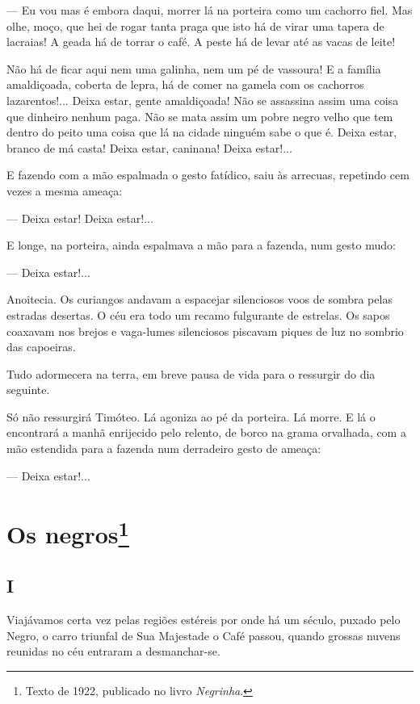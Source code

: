 --- Eu vou mas é embora daqui, morrer lá na porteira como um cachorro
fiel. Mas olhe, moço, que hei de rogar tanta praga que isto há de virar
uma tapera de lacraias! A geada há de torrar o café. A peste há de levar
até as vacas de leite!

Não há de ficar aqui nem uma galinha, nem um pé de vassoura! E a família
amaldiçoada, coberta de lepra, há de comer na gamela com os cachorros
lazarentos!... Deixa estar, gente amaldiçoada! Não se assassina assim
uma coisa que dinheiro nenhum paga. Não se mata assim um pobre negro
velho que tem dentro do peito uma coisa que lá na cidade ninguém sabe o
que é. Deixa estar, branco de má casta! Deixa estar, caninana! Deixa
estar!...

E fazendo com a mão espalmada o gesto fatídico, saiu às arrecuas,
repetindo cem vezes a mesma ameaça:

--- Deixa estar! Deixa estar!...

E longe, na porteira, ainda espalmava a mão para a fazenda, num gesto
mudo:

--- Deixa estar!...

Anoitecia. Os curiangos andavam a espacejar silenciosos voos de sombra
pelas estradas desertas. O céu era todo um recamo fulgurante de
estrelas. Os sapos coaxavam nos brejos e vaga-lumes silenciosos piscavam
piques de luz no sombrio das capoeiras.

Tudo adormecera na terra, em breve pausa de vida para o ressurgir do dia
seguinte.

Só não ressurgirá Timóteo. Lá agoniza ao pé da porteira. Lá morre. E lá
o encontrará a manhã enrijecido pelo relento, de borco na grama
orvalhada, com a mão estendida para a fazenda num derradeiro gesto de
ameaça:

--- Deixa estar!...

\chapter{Os negros\footnote[*]{Texto de 1922, publicado no livro \emph{Negrinha}.}}

\section{I}

Viajávamos certa vez pelas regiões estéreis por onde há um século,
puxado pelo Negro, o carro triunfal de Sua Majestade o Café passou,
quando grossas nuvens reunidas no céu entraram a desmanchar-se.

